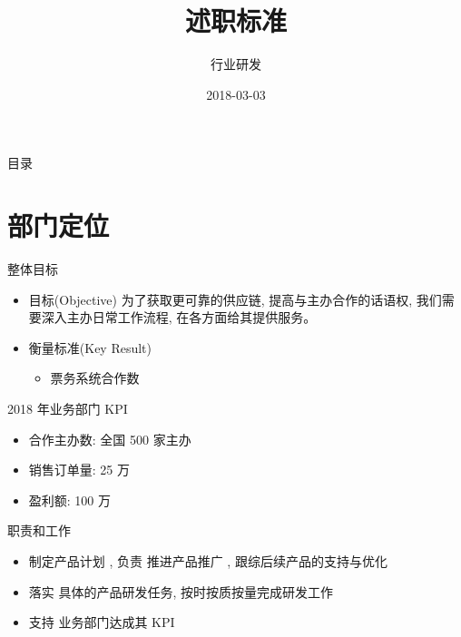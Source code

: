 \documentclass[presentation, bigger]{beamer}
\author{行业研发}
\date{2018-03-03}
\title{述职标准}
\begin{document}
\maketitle
\begin{frame}{目录}
\tableofcontents
\end{frame}


\section{部门定位}
\label{sec:orga21d06e}
\begin{frame}[label={sec:org6e3fd95}]{整体目标}
\begin{itemize}
\item 目标(Objective)
为了获取更可靠的供应链, 提高与主办合作的话语权,  我们需要深入主办日常工作流程, 在各方面给其提供服务。

\item 衡量标准(Key Result)
\begin{itemize}
\item 票务系统合作数
\end{itemize}
\end{itemize}
\end{frame}

\begin{frame}[label={sec:orgecb0ade}]{2018 年业务部门 KPI}
\begin{itemize}
\item 合作主办数: \alert{全国 500 家主办}
\item 销售订单量: \alert{25 万}
\item 盈利额:  \alert{100 万}
\end{itemize}
\end{frame}

\begin{frame}[label={sec:org9aae513}]{职责和工作}
\begin{itemize}
\item \alert{制定产品计划} , 负责 \alert{推进产品推广} , 跟综后续产品的支持与优化
\item \alert{落实} 具体的产品研发任务, 按时按质按量完成研发工作
\item \alert{支持} 业务部门达成其 KPI
\end{itemize}
\end{frame}
\end{document}
